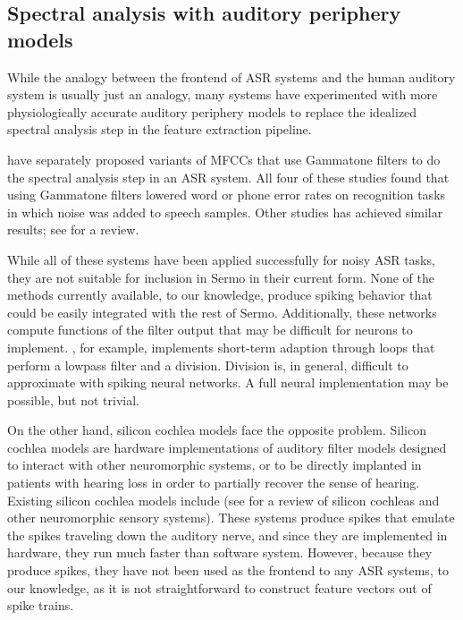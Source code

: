 \subsection{Spectral analysis with auditory periphery models}

While the analogy
between the frontend of ASR systems
and the human auditory system
is usually just an analogy,
many systems have experimented with
more physiologically accurate
auditory periphery models
to replace the idealized spectral analysis step
in the feature extraction pipeline.

\citet{tchorz1999,dimitriadis2005,schluter2007,shao2009}
have separately proposed variants of MFCCs
that use Gammatone filters
to do the spectral analysis step in an ASR system.
All four of these studies
found that using Gammatone filters
lowered word or phone error rates
on recognition tasks in which
noise was added to speech samples.
Other studies has achieved similar results;
see \citet{stern2012} for a review.

While all of these systems
have been applied successfully
for noisy ASR tasks,
they are not suitable
for inclusion in Sermo in their current form.
None of the methods currently available,
to our knowledge, produce spiking behavior
that could
be easily integrated with the rest of Sermo.
Additionally, these networks compute
functions of the filter output that
may be difficult for neurons to implement.
\citet{tchorz1999}, for example,
implements short-term adaption
through loops that perform
a lowpass filter and a division.
Division is, in general,
difficult to approximate with spiking neural networks.
A full neural implementation
may be possible,
but not trivial.

On the other hand,
silicon cochlea models face the opposite problem.
Silicon cochlea models are hardware implementations
of auditory filter models
designed to interact with other neuromorphic systems,
or to be directly implanted in
patients with hearing loss
in order to partially recover the sense of hearing.
Existing silicon cochlea models include
\citet{chan2007,hamilton2008,wen2009,karuppuswamy2013}
(see \citealt{liu2010} for a review of
silicon cochleas
and other neuromorphic sensory systems).
These systems produce spikes
that emulate the spikes
traveling down the auditory nerve,
and since they are implemented in hardware,
they run much faster than software system.
However, because they produce spikes,
they have not been used
as the frontend to any ASR systems,
to our knowledge,
as it is not straightforward to
construct feature vectors
out of spike trains.


